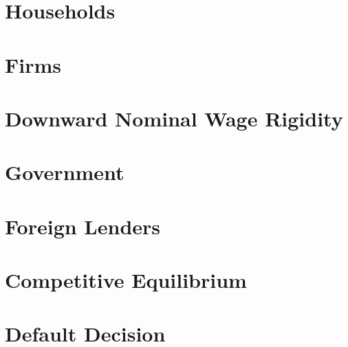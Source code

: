 \section{Households}


\section{Firms}


\section{Downward Nominal Wage Rigidity}


\section{Government}


\section{Foreign Lenders}


\section{Competitive Equilibrium}


\section{Default Decision}


